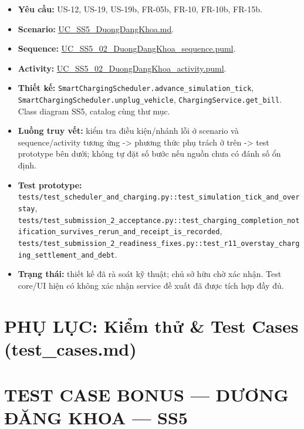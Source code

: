\documentclass[11pt,a4paper]{article}
\providecommand{\tightlist}{%
  \setlength{\itemsep}{0pt}\setlength{\parskip}{0pt}}
\begin{document}
\begin{itemize}
\tightlist
\item
  \textbf{Yêu cầu:} US-12, US-19, US-19b, FR-05b, FR-10, FR-10b, FR-15b.
\item
  \textbf{Scenario:}
  \href{../../../../docs/diagrams/Use-case\%20detail-scenario/SS5/Usecase\%20scenario/UC_SS5_DuongDangKhoa.md}{UC\_SS5\_DuongDangKhoa.md}.
\item
  \textbf{Sequence:}
  \href{../../../../docs/diagrams/Use-case\%20detail-scenario/SS5/Sequence\%20diagrams/UC_SS5_02_DuongDangKhoa_sequence.puml}{UC\_SS5\_02\_DuongDangKhoa\_sequence.puml}.
\item
  \textbf{Activity:}
  \href{../../../../docs/diagrams/Use-case\%20detail-scenario/SS5/Activity\%20diagrams/UC_SS5_02_DuongDangKhoa_activity.puml}{UC\_SS5\_02\_DuongDangKhoa\_activity.puml}.
\item
  \textbf{Thiết kế:}
  \texttt{SmartChargingScheduler.advance\_simulation\_tick},
  \texttt{SmartChargingScheduler.unplug\_vehicle},
  \texttt{ChargingService.get\_bill}. Class diagram SS5, catalog cùng
  thư mục.
\item
  \textbf{Luồng truy vết:} kiểm tra điều kiện/nhánh lỗi ở scenario và
  sequence/activity tương ứng -\textgreater{} phương thức phụ trách ở
  trên -\textgreater{} test prototype bên dưới; không tự đặt số bước nếu
  nguồn chưa có đánh số ổn định.
\item
  \textbf{Test prototype:}
  \texttt{tests/test\_scheduler\_and\_charging.py::test\_simulation\_tick\_and\_overstay},
  \texttt{tests/test\_submission\_2\_acceptance.py::test\_charging\_completion\_notification\_survives\_rerun\_and\_receipt\_is\_recorded},
  \texttt{tests/test\_submission\_2\_readiness\_fixes.py::test\_r11\_overstay\_charging\_settlement\_and\_debt}.
\item
  \textbf{Trạng thái:} thiết kế đã rà soát kỹ thuật; chủ sở hữu chờ xác
  nhận. Test core/UI hiện có không xác nhận service đề xuất đã được tích
  hợp đầy đủ.
\end{itemize}

\newpage
\section*{PHỤ LỤC: Kiểm thử \& Test Cases (test\_cases.md)}
\hypertarget{test-case-bonus-dux1b0ux1a1ng-ux111ux103ng-khoa-ss5}{%
\section{TEST CASE BONUS --- DƯƠNG ĐĂNG KHOA ---
SS5}\label{test-case-bonus-dux1b0ux1a1ng-ux111ux103ng-khoa-ss5}}
\end{document}
